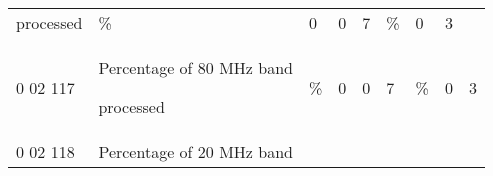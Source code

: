 \begin{longtable}[]{@{}lllllllll@{}}
\begin{minipage}[t]{0.08\columnwidth}
processed\strut
\end{minipage} & \begin{minipage}[t]{0.08\columnwidth}\raggedright
\%\strut
\end{minipage} & \begin{minipage}[t]{0.08\columnwidth}\raggedright
0\strut
\end{minipage} & \begin{minipage}[t]{0.08\columnwidth}\raggedright
0\strut
\end{minipage} & \begin{minipage}[t]{0.08\columnwidth}\raggedright
7\strut
\end{minipage} & \begin{minipage}[t]{0.08\columnwidth}\raggedright
\%\strut
\end{minipage} & \begin{minipage}[t]{0.08\columnwidth}\raggedright
0\strut
\end{minipage} & \begin{minipage}[t]{0.08\columnwidth}\raggedright
3\strut
\end{minipage}\tabularnewline
\begin{minipage}[t]{0.08\columnwidth}\raggedright
0 02 117\strut
\end{minipage} & \begin{minipage}[t]{0.08\columnwidth}\raggedright
Percentage of 80 MHz band

processed\strut
\end{minipage} & \begin{minipage}[t]{0.08\columnwidth}\raggedright
\%\strut
\end{minipage} & \begin{minipage}[t]{0.08\columnwidth}\raggedright
0\strut
\end{minipage} & \begin{minipage}[t]{0.08\columnwidth}\raggedright
0\strut
\end{minipage} & \begin{minipage}[t]{0.08\columnwidth}\raggedright
7\strut
\end{minipage} & \begin{minipage}[t]{0.08\columnwidth}\raggedright
\%\strut
\end{minipage} & \begin{minipage}[t]{0.08\columnwidth}\raggedright
0\strut
\end{minipage} & \begin{minipage}[t]{0.08\columnwidth}\raggedright
3\strut
\end{minipage}\tabularnewline
\begin{minipage}[t]{0.08\columnwidth}\raggedright
0 02 118\strut
\end{minipage} & \begin{minipage}[t]{0.08\columnwidth}\raggedright
Percentage of 20 MHz band


\end{minipage}
\end{longtable}
